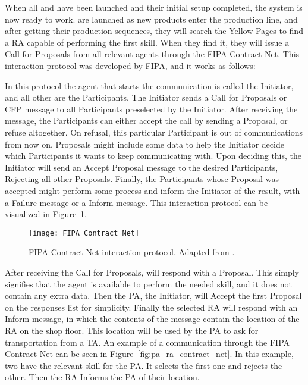 When all  and  have been launched and their initial setup completed, the system is now ready to work.  are launched as new products enter the production line, and after getting their production sequences, they will search the Yellow Pages to find a \acrshort{RA} capable of performing the first skill. When they find it, they will issue a Call for Proposals from all relevant agents through the \acrshort{FIPA} Contract Net. This interaction protocol was developed by \acrshort{FIPA}, and it works as follows:

In this protocol the agent that starts the communication is called the Initiator, and all other are the Participants. The Initiator sends a Call for Proposals or CFP message to all Participants preselected by the Initiator. After receiving the message, the Participants can either accept the call by sending a Proposal, or refuse altogether. On refusal, this particular Participant is out of communications from now on. Proposals might include some data to help the Initiator decide which Participants it wants to keep communicating with. Upon deciding this, the Initiator will send an Accept Proposal message to the desired Participants, Rejecting all other Proposals. Finally, the Participants whose Proposal was accepted might perform some process and inform the Initiator of the result, with a Failure message or a Inform message. This interaction protocol can be visualized in Figure~\ref{fig:contract_net_protocol}.\\

\begin{figure}[h!]
	\centering
	\texttt{[image: FIPA\_Contract\_Net]}
	\caption{\acrshort{FIPA} Contract Net interaction protocol. Adapted from \cite{FIPA_Contract_Net}.}
	\label{fig:contract_net_protocol}
\end{figure}

After receiving the Call for Proposals,  will respond with a Proposal. This simply signifies that the agent is available to perform the needed skill, and it does not contain any extra data. Then the \acrshort{PA}, the Initiator, will Accept the first Proposal on the responses list for simplicity. Finally the selected \acrshort{RA} will respond with an Inform message, in which the contents of the message contain the location of the \acrshort{RA} on the shop floor. This location will be used by the \acrshort{PA} to ask for transportation from a \acrshort{TA}. An example of a communication through the \acrshort{FIPA} Contract Net can be seen in Figure~\ref{fig:pa_ra_contract_net}. In this example, two  have the relevant skill for the \acrshort{PA}. It selects the first one and rejects the other. Then the \acrshort{RA} Informs the \acrshort{PA} of their location.\\


